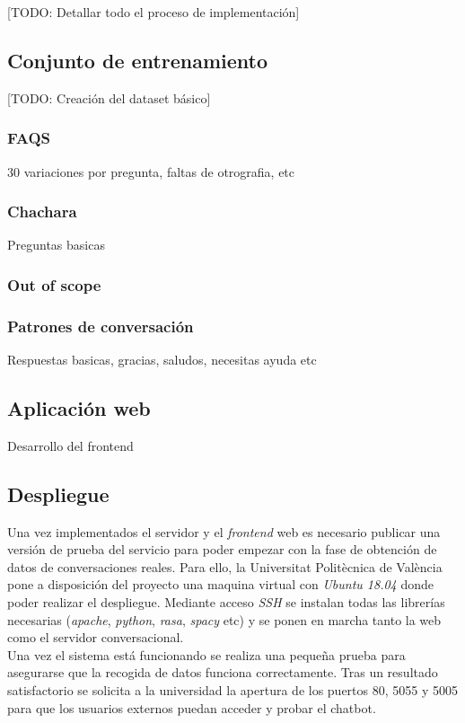 [TODO: Detallar todo el proceso de implementación]

\subsection{Conjunto de entrenamiento}
[TODO: Creación del dataset básico]

\subsubsection{FAQS}
30 variaciones por pregunta, faltas de otrografia, etc

\subsubsection{Chachara}
Preguntas basicas

\subsubsection{Out of scope}
\cite{bestPracticesNLU}


\subsubsection{Patrones de conversación}
Respuestas basicas, gracias, saludos, necesitas ayuda etc

\subsection{Aplicación web}
Desarrollo del frontend

\subsection{Despliegue}
Una vez implementados el servidor y el \textit{frontend} web es necesario publicar una versión de prueba del servicio para poder empezar con la fase de obtención de datos de conversaciones reales. Para ello, la Universitat Politècnica de València pone a disposición del proyecto una maquina virtual con \textit{Ubuntu 18.04} donde poder realizar el despliegue. Mediante acceso \textit{SSH} se instalan todas las librerías necesarias (\textit{apache}, \textit{python}, \textit{rasa}, \textit{spacy} etc) y se ponen en marcha tanto la web como el servidor conversacional.\\

Una vez el sistema está funcionando se realiza una pequeña prueba para asegurarse que la recogida de datos funciona correctamente. Tras un resultado satisfactorio se solicita a la universidad la apertura de los puertos 80, 5055 y 5005 para que los usuarios externos puedan acceder y probar el chatbot.\\


